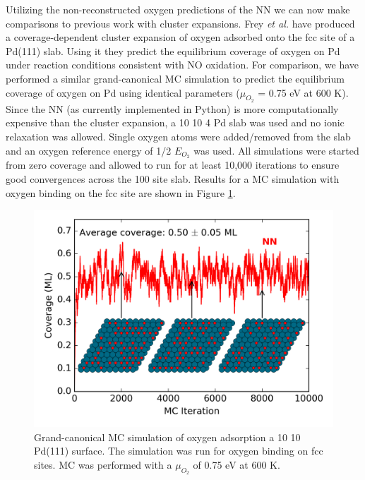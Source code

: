 \documentclass[12pt,oneside]{cmuthesis}
\begin{document}
Utilizing the non-reconstructed oxygen predictions of the NN we can now make comparisons to previous work with cluster expansions. Frey \emph{et al.}  have produced a coverage-dependent cluster expansion of oxygen adsorbed onto the fcc site of a Pd(111) slab. Using it they predict the equilibrium coverage of oxygen on Pd under reaction conditions consistent with NO oxidation. For comparison, we have performed a similar grand-canonical MC simulation to predict the equilibrium coverage of oxygen on Pd using identical
parameters (\(\mu_{O_{2}}\) = 0.75 eV at 600 K). Since the NN (as currently implemented in Python) is more computationally expensive than the cluster expansion, a 10 \texttimes{} 10 \texttimes{} 4 Pd slab was used and no ionic relaxation was allowed. Single oxygen atoms were added/removed from the slab and an oxygen reference energy of 1/2 \(E_{O_{2}}\) was used. All simulations were started from zero coverage and allowed to run for at least 10,000 iterations to ensure good convergences across the 100 site slab. Results for a MC simulation with oxygen binding on the fcc site are shown in Figure \ref{fig-PdO-MC}.

\begin{figure}[htbp]
\centering
\includegraphics[width=5.5in]{./images/Pd-MC.png}
\caption{\label{fig-PdO-MC}
Grand-canonical MC simulation of oxygen adsorption a 10 \texttimes{} 10 Pd(111) surface. The simulation was run for oxygen binding on fcc sites. MC was performed with a \(\mu_{O_{2}}\) of 0.75 eV at 600 K.}
\end{figure}
\end{document}
